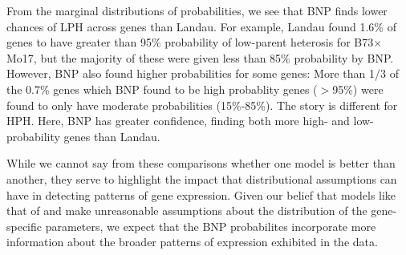 From the marginal distributions of probabilities, we see that BNP finds lower chances of LPH across genes than Landau. For example, Landau found 1.6\% of genes to have greater than 95\% probability of low-parent heterosis for B73$\times$Mo17, but the majority of these were given less than 85\% probability by BNP. However, BNP also found higher probabilities for some genes: More than 1/3 of the 0.7\% genes which BNP found to be high probablity genes ($>$95\%) were found to only have moderate probabilities (15\%-85\%). The story is different for HPH. Here, BNP has greater confidence, finding both more high- and low-probability genes than Landau.

While we cannot say from these comparisons whether one model is better than another, they serve to highlight the impact that distributional assumptions can have in detecting patterns of gene expression. Given our belief that models like that of \citet{landau2016high} and \citet{deseq2014} make unreasonable assumptions about the distribution of the gene-specific parameters, we expect that the BNP probabilites incorporate more information about the broader patterns of expression exhibited in the data.

